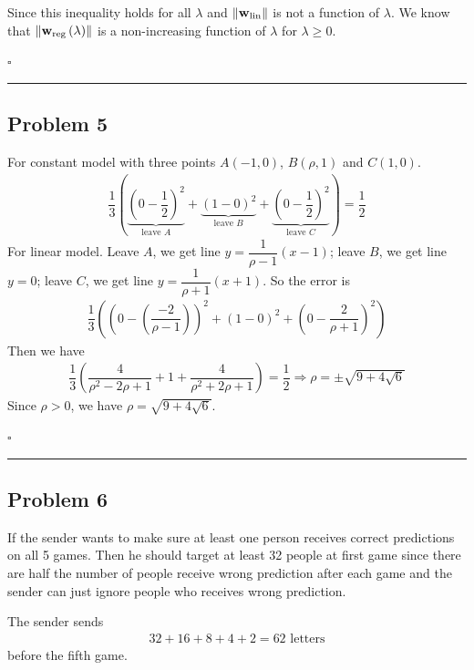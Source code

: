 \documentclass[12pt]{article}
\newcommand*{\QEDB}{\hfill\ensuremath{\square}}
\newcommand{\ParTh}[1]{\left(#1\right)}
\newcommand{\BF}[1]{{\bf#1}}
\newcommand{\VecAbsVal}[1]{\left\|#1\right\|}
\newcommand{\horrule}[1]{\rule{\linewidth}{#1}}
\begin{document}
Since this inequality holds for all $\lambda$ and $\VecAbsVal{\BF{w}_{\text{lin}}}$ is not a function of $\lambda$. We know that $\VecAbsVal{\BF{w}_{\text{reg}}\ParTh{\lambda}}$ is a non-increasing function of $\lambda$ for $\lambda\geq0$.

\QEDB

\horrule{0.5pt}

\subsection*{Problem 5}

For constant model with three points $A\ParTh{-1,0}$, $B\ParTh{\rho,1}$ and $C\ParTh{1,0}$.
\begin{align}
\dfrac{1}{3}\ParTh{\underbrace{\ParTh{0-\dfrac{1}{2}}^2}_{\text{leave }A}+\underbrace{\ParTh{1-0}^2}_{\text{leave }B}+\underbrace{\ParTh{0-\dfrac{1}{2}}^2}_{\text{leave }C}}=\dfrac{1}{2}
\end{align}
For linear model. Leave $A$, we get line $y=\dfrac{1}{\rho-1}\ParTh{x-1}$; leave $B$, we get line $y=0$; leave $C$, we get line $y=\dfrac{1}{\rho+1}\ParTh{x+1}$. So the error is
\begin{align}
\dfrac{1}{3}\ParTh{\ParTh{0-\ParTh{\dfrac{-2}{\rho-1}}}^2+\ParTh{1-0}^2+\ParTh{0-\dfrac{2}{\rho+1}}^2}
\end{align}
Then we have
\begin{align}
\dfrac{1}{3}\ParTh{\dfrac{4}{{\rho^2-2\rho+1}}+1+\dfrac{4}{{\rho^2+2\rho+1}}}=\dfrac{1}{2}\Rightarrow\rho=\pm\sqrt{9+4\sqrt{6}}
\end{align}
Since $\rho>0$, we have $\rho=\sqrt{9+4\sqrt{6}}$.

\QEDB

\horrule{0.5pt}

\subsection*{Problem 6}

If the sender wants to make sure at least one person receives correct predictions on all 5 games. Then he should target at least 32 people at first game since there are half the number of people receive wrong prediction after each game and the sender can just ignore people who receives wrong prediction.

The sender sends
\begin{align}
32+16+8+4+2=62\text{ letters}
\end{align}
before the fifth game.
\end{document}
